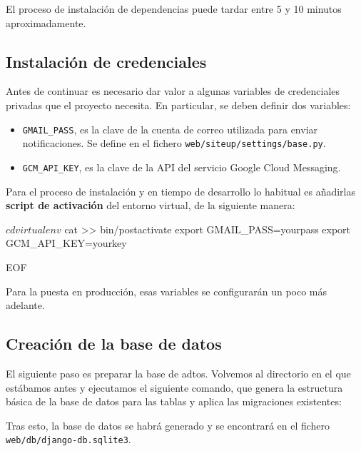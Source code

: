 El proceso de instalación de dependencias puede tardar entre 5 y 10 minutos aproximadamente.

\subsection{Instalación de credenciales}
\label{subsec:instalacion-credenciales}

Antes de continuar es necesario dar valor a algunas variables de credenciales
privadas que el proyecto necesita. En particular, se deben definir dos variables:

\begin{itemize}
\item \texttt{GMAIL\_PASS}, es la clave de la cuenta de correo utilizada para
  enviar notificaciones. Se define en el fichero \texttt{web/siteup/settings/base.py}.
\item \texttt{GCM\_API\_KEY}, es la clave de la API del servicio Google Cloud Messaging.
\end{itemize}

Para el proceso de instalación y en tiempo de desarrollo lo habitual es
añadirlas \textbf{script de activación} del entorno virtual, de la siguiente
manera:

\begin{bashcode}
$ cdvirtualenv
$ cat >> bin/postactivate
export GMAIL_PASS=yourpass
export GCM_API_KEY=yourkey

EOF
\end{bashcode}

Para la puesta en producción, esas variables se configurarán un poco más adelante.

\subsection{Creación de la base de datos}

El siguiente paso es preparar la base de adtos. Volvemos al directorio en el que
estábamos antes y ejecutamos el siguiente comando, que genera la estructura
básica de la base de datos para las tablas y aplica las migraciones existentes:


Tras esto, la base de datos se habrá generado y se encontrará en el fichero\\
\texttt{web/db/django-db.sqlite3}.

